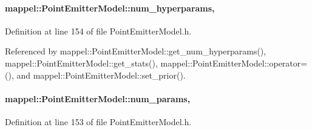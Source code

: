 \paragraph[{\texorpdfstring{num\+\_\+hyperparams}{num_hyperparams}}]{ mappel\+::\+Point\+Emitter\+Model\+::num\+\_\+hyperparams\hspace{0.3cm}{\ttfamily [protected]}, {\ttfamily [inherited]}}\hypertarget{classmappel_1_1PointEmitterModel_ab2423214fdd81c8212118770b5b17b1f}{}\label{classmappel_1_1PointEmitterModel_ab2423214fdd81c8212118770b5b17b1f}


Definition at line 154 of file Point\+Emitter\+Model.\+h.



Referenced by mappel\+::\+Point\+Emitter\+Model\+::get\+\_\+num\+\_\+hyperparams(), mappel\+::\+Point\+Emitter\+Model\+::get\+\_\+stats(), mappel\+::\+Point\+Emitter\+Model\+::operator=(), and mappel\+::\+Point\+Emitter\+Model\+::set\+\_\+prior().

\paragraph[{\texorpdfstring{num\+\_\+params}{num_params}}]{ mappel\+::\+Point\+Emitter\+Model\+::num\+\_\+params\hspace{0.3cm}{\ttfamily [protected]}, {\ttfamily [inherited]}}\hypertarget{classmappel_1_1PointEmitterModel_a9af0484391bd6021ddc04ac666ab49ad}{}\label{classmappel_1_1PointEmitterModel_a9af0484391bd6021ddc04ac666ab49ad}


Definition at line 153 of file Point\+Emitter\+Model.\+h.



